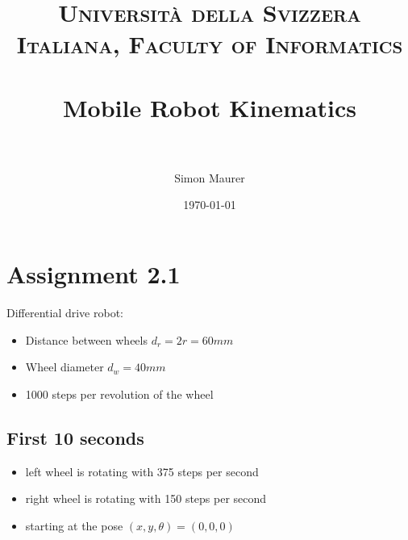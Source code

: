 \documentclass[paper=a4, fontsize=11pt]{scrartcl} %
\title{	
\normalfont \normalsize 
\textsc{Università della Svizzera Italiana, Faculty of Informatics} \\ [25pt] %
\horrule{0.5pt} \\[0.4cm] %
\huge Mobile Robot Kinematics \\ %
\horrule{2pt} \\[0.5cm] %
}
\author{Simon Maurer} %
\date{\normalsize\today} %
\begin{document}
\maketitle %


\section{Assignment 2.1}

Differential drive robot:
\begin{itemize}
    \item Distance between wheels $ d_r = 2r = 60 mm $
    \item Wheel diameter $ d_w = 40 mm $
    \item 1000 steps per revolution of the wheel
\end{itemize}


\subsection{First 10 seconds}
\begin{itemize}
    \item left wheel is rotating with 375 steps per second
    \item right wheel is rotating with 150 steps per second
    \item starting at the pose $ (x, y, \theta) = (0, 0, 0) $
\end{itemize}
\end{document}
